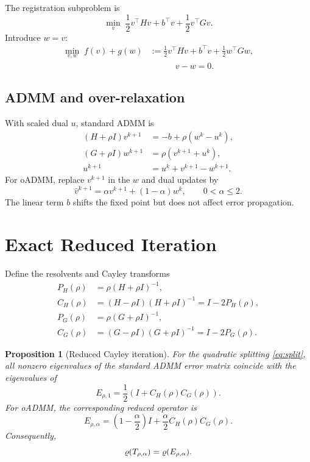 \documentclass[pdflatex,iicol,sn-mathphys-num]{sn-jnl}
\newtheorem{proposition}[theorem]{Proposition}\newtheorem{lemma}[theorem]{Lemma}
\theoremstyle{definition}\newtheorem{definition}[theorem]{Definition}\newtheorem{remark}[theorem]{Remark}
\begin{document}
The registration subproblem is
\begin{equation}
\min_v\;\frac12 v^\top Hv+b^\top v+\frac12v^\top Gv.
\label{eq:quadratic}
\end{equation}
Introduce $w=v$:
\begin{equation}
\begin{aligned}
\min_{v,w}\;f(v)+g(w)
&:=\frac12v^\top Hv+b^\top v+\frac12w^\top Gw,\\
&\hspace{3em}v-w=0.
\end{aligned}
\label{eq:split}
\end{equation}

\subsection{ADMM and over-relaxation}
With scaled dual $u$, standard ADMM is
\begin{align}
(H+\rho I)v^{k+1}&=-b+\rho(w^k-u^k),\label{eq:vupdate}\\
(G+\rho I)w^{k+1}&=\rho(v^{k+1}+u^k),\label{eq:wupdate}\\
u^{k+1}&=u^k+v^{k+1}-w^{k+1}.\label{eq:uupdate}
\end{align}
For oADMM, replace $v^{k+1}$ in the $w$ and dual updates by
\[
\widehat v^{k+1}=\alpha v^{k+1}+(1-\alpha)w^k,
\qquad 0<\alpha\le2.
\]
The linear term $b$ shifts the fixed point but does not affect error propagation.

\section{Exact Reduced Iteration}
Define the resolvents and Cayley transforms
\begin{align}
P_H(\rho)&=\rho(H+\rho I)^{-1},\\
C_H(\rho)&=(H-\rho I)(H+\rho I)^{-1}=I-2P_H(\rho),\\
P_G(\rho)&=\rho(G+\rho I)^{-1},\\
C_G(\rho)&=(G-\rho I)(G+\rho I)^{-1}=I-2P_G(\rho).
\end{align}

\begin{proposition}[Reduced Cayley iteration]\label{prop:reduced}
For the quadratic splitting \eqref{eq:split}, all nonzero eigenvalues of the standard ADMM error matrix coincide with the eigenvalues of
\begin{equation}
E_{\rho,1}=\frac12\left(I+C_H(\rho)C_G(\rho)\right).
\label{eq:Estandard}
\end{equation}
For oADMM, the corresponding reduced operator is
\begin{equation}
E_{\rho,\alpha}
=\left(1-\frac{\alpha}{2}\right)I
+\frac{\alpha}{2}C_H(\rho)C_G(\rho).
\label{eq:Ealpha}
\end{equation}
Consequently,
\[
\varrho(T_{\rho,\alpha})=\varrho(E_{\rho,\alpha}).
\]
\end{proposition}
\end{document}
